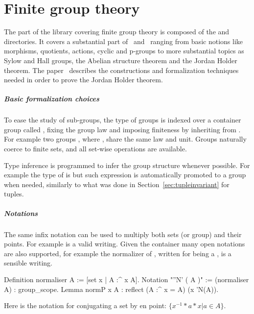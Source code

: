 \chapter{Finite group theory}

The part of the library covering finite group theory is composed of
the  and  directories.  It covers a substantial
part of~\cite{gorenstein2007finite} and~\cite{9781139175319} ranging from
basic notions like morphisms, quotients, actions, cyclic and p-groups to more
substantial topics as Sylow and Hall groups, the Abelian
structure theorem and the Jordan Holder theorem.
The paper~\cite{DBLP:conf/mkm/Mahboubi13}
describes the constructions and formalization techniques
needed in order to prove the Jordan Holder theorem.

\paragraph{Basic formalization choices} To ease the study of sub-groups,
the type of groups is indexed over a container group called
, fixing the group law and imposing finiteness by
inheriting from .
For example two groups ,
where , share the same law and unit.  Groups
naturally coerce to finite sets, and all set-wise operations are available.

Type inference is programmed to infer the group structure whenever possible.
For example the type of  is  but such expression
is automatically promoted to a group when needed, similarly to what 
was done in Section~\ref{sec:tupleinvariant} for tuples.

\paragraph{Notations} The same infix \C{*} notation can be used to
multiply both sets (or group) and their points.  For example
 is a valid writing.  Given the 
container many open notations are also supported, for example the normalizer
of , written  for  being a , is a sensible
writing.

\begin{coq}{}{}
Definition normaliser A := [set x | A :^ x \subset A].
Notation "''N' ( A )" := (normaliser A) : group_scope.
Lemma normP x A : reflect (A :^ x = A) (x \in 'N(A)).
\end{coq}
Here \C{:^} is the notation for conjugating a set by en point:
$\{x^{-1}*a*x | a\in A\}$.

